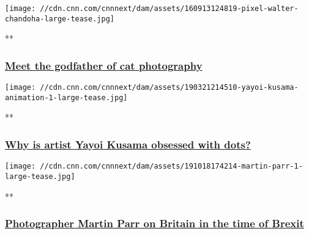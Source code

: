 \href{/videos/arts/2016/09/13/pixel-walter-chandoha-ms.cnn/video/playlists/cnn-style/}{}

\texttt{[image: //cdn.cnn.com/cnnnext/dam/assets/160913124819-pixel-walter-chandoha-large-tease.jpg]}

**

\hypertarget{meet-the-godfather-of-cat-photography}{%
\subsubsection{\texorpdfstring{\href{/videos/arts/2016/09/13/pixel-walter-chandoha-ms.cnn/video/playlists/cnn-style/}{Meet
the godfather of cat
photography}}{Meet the godfather of cat photography}}\label{meet-the-godfather-of-cat-photography}}

\href{/videos/arts/2019/03/21/yayoi-kusama-artist-dots-animation-lon-orig.cnn/video/playlists/cnn-style/}{}

\texttt{[image: //cdn.cnn.com/cnnnext/dam/assets/190321214510-yayoi-kusama-animation-1-large-tease.jpg]}

**

\hypertarget{why-is-artist-yayoi-kusama-obsessed-with-dots}{%
\subsubsection{\texorpdfstring{\href{/videos/arts/2019/03/21/yayoi-kusama-artist-dots-animation-lon-orig.cnn/video/playlists/cnn-style/}{Why
is artist Yayoi Kusama obsessed with
dots?}}{Why is artist Yayoi Kusama obsessed with dots?}}\label{why-is-artist-yayoi-kusama-obsessed-with-dots}}

\href{/videos/style/2019/10/18/martin-parr-photography-brexit-orig.cnn/video/playlists/cnn-style/}{}

\texttt{[image: //cdn.cnn.com/cnnnext/dam/assets/191018174214-martin-parr-1-large-tease.jpg]}

**

\hypertarget{photographer-martin-parr-on-britain-in-the-time-of-brexit}{%
\subsubsection{\texorpdfstring{\href{/videos/style/2019/10/18/martin-parr-photography-brexit-orig.cnn/video/playlists/cnn-style/}{Photographer
Martin Parr on Britain in the time of
Brexit}}{Photographer Martin Parr on Britain in the time of Brexit}}\label{photographer-martin-parr-on-britain-in-the-time-of-brexit}}

